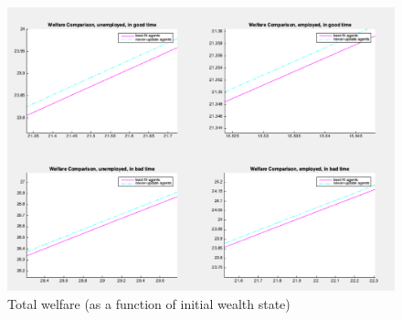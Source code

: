 \begin{figure}[htbp]
\centering
\includegraphics[width=\textwidth]{img/bigger.png}
\caption{Total welfare (as a function of initial wealth state)}
\end{figure}



















